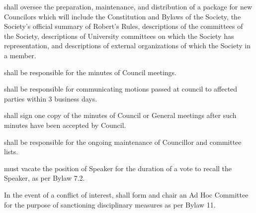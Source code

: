 \begin{longenum}[ label*=\thesubsection.\arabic*., align=left]
    \item shall oversee the preparation, maintenance, and distribution of a package for new Councilors which will include the Constitution and Bylaws of the Society, the Society's official summary of Robert's Rules, descriptions of the committees of the Society, descriptions of University committees on which the Society has representation, and descriptions of external organizations of which the Society in a member.
    \item shall be responsible for the minutes of Council meetings.
    \item shall be responsible for communicating motions passed at council to affected parties within 3 business days. 
    \item shall sign one copy of the minutes of Council or General meetings after such minutes have been accepted by Council.
    \item shall be responsible for the ongoing maintenance of Councillor and committee lists.
    \item must vacate the position of Speaker for the duration of a vote to recall the Speaker, as per Bylaw 7.2.
    \item In the event of a conflict of interest, shall form and chair an Ad Hoc Committee for the purpose of sanctioning disciplinary measures as per Bylaw 11.
\end{longenum}
